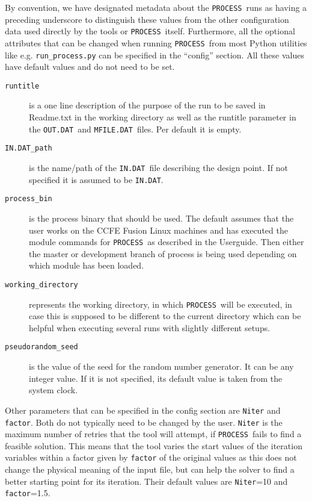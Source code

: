 \documentclass[11pt,a4paper]{article}
\newcommand{\indat}{\mbox{\texttt{IN.DAT}}}
\newcommand{\mfile}{\mbox{\texttt{MFILE.DAT}}}
\newcommand{\outdat}{\mbox{\texttt{OUT.DAT}}}
\newcommand{\process}{\mbox{\texttt{PROCESS}}}
\begin{document}
By convention, we have designated metadata about the \process\ runs as having
a preceding underscore to distinguish these values from the other
configuration data used directly by the tools or \process\
itself. Furthermore, all the optional attributes that can be changed when
running \process\ from most Python utilities like
e.g. \texttt{run\_process.py} can be specified in the ``config'' section. All
these values have default values and do not need to be set.
\begin{description}
\item[\texttt{runtitle}] is a one line description of the purpose of the run
  to be saved in Readme.txt in the working directory as well as the runtitle
  parameter in the \outdat\ and \mfile\ files. Per default it is empty.
\item[\texttt{IN.DAT\_path}] is the name/path of the \indat\ file describing
  the design point. If not specified it is assumed to be \indat.
\item[\texttt{process\_bin}] is the process binary that should be used. The
  default assumes that the user works on the CCFE Fusion Linux machines and
  has executed the module commands for \process\ as described in the Userguide. Then either the master or development branch of
  process is being used depending on which module has been loaded.
\item[\texttt{working\_directory}] represents the working directory, in which
  \process\ will be executed, in case this is supposed to be different to the
  current directory which can be helpful when executing several runs with
  slightly different setups.
\item[\texttt{pseudorandom\_seed}] is the value of the seed for the random
  number generator. It can be any integer value. If it is not specified, its
  default value is taken from the system clock.
\end{description}

Other parameters that can be specified in the config section are
\texttt{Niter} and \texttt{factor}. Both do not typically need to be changed
by the user. \texttt{Niter} is the maximum number of retries that the tool
will attempt, if \process\ fails to find a feasible solution. This means that
the tool varies the start values of the iteration variables within a factor
given by \texttt{factor} of the original values as this does not change the
physical meaning of the input file, but can help the solver to find a better
starting point for its iteration. Their default values are \texttt{Niter}=10
and \texttt{factor}=1.5.
\end{document}

